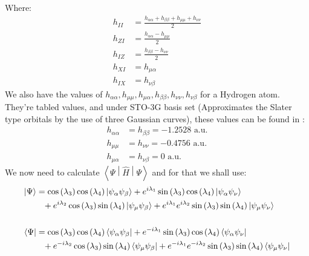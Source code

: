 \documentclass{aux/ttuthes2007}
\newcommand{\bra}[1]{\ensuremath{\left\langle#1\right\vert}}
\newcommand{\ket}[1]{\ensuremath{\left|#1\right\rangle}}
\newcommand{\sandwich}[3]{\left< #1 \middle\vert #2 \middle\vert #3 \right>}
\newcommand{\s}[1]{\sin\left( #1 \right)}
\newcommand{\co}[1]{\cos\left( #1 \right)}
\newcommand{\uo}[1]{
		\IfEqCase{#1}{
			{0}{\mu}
			{1}{\nu}
			{2}{\xi}
		}[\PackageError{uo}{Undefined option to uo: #1}{}]
}
\newcommand{\oo}[1]{
		\IfEqCase{#1}{
			{0}{\alpha}
			{1}{\beta}
			{2}{\gamma}
		}[\PackageError{unocorb}{Undefined option to unuo: #1}{}]
}
\begin{document}
%
Where:
%
\begin{equation*}
	\begin{split}
			h_{II}
		&=	\frac{h_{\alpha\alpha} + h_{\beta\beta} + h_{\mu\mu} + h_{\nu\nu}} 2
%
	\\
%
			h_{ZI}
		&=	\frac{h_{\alpha\alpha} - h_{\mu\mu}} 2
%
	\\
%
			h_{IZ}
		&=	\frac{h_{\beta\beta} - h_{\nu\nu}} 2
%
	\\
%
			h_{XI}
		&= 	h_{\mu\alpha}
%
	\\
%
			h_{IX}
		&=	h_{\nu\beta}
	\end{split}
\end{equation*}
%
We also have the values of
$
h_{\alpha\alpha}, h_{\mu\mu}, h_{\mu\alpha}, h_{\beta\beta}, h_{\nu\nu}, h_{\nu\beta}
$ for a Hydrogen atom. They're tabled values, and under STO-3G basis set (Approximates the Slater type orbitals by the use of three Gaussian curves), these values can be found in :
\begin{equation*}
	\begin{split}
		h_{\alpha\alpha} &= h_{\beta\beta} = -1.2528 \text{ a.u.} \\
		h_{\mu\mu} &= h_{\nu\nu} = -0.4756 \text{ a.u.}\\
		h_{\mu\alpha} &= h_{\nu\beta} = 0 \text{ a.u.}
	\end{split}
\end{equation*}
We now need to calculate $\sandwich{\Psi}{\hat H}{\Psi}$ and for that we shall use:
%
\begin{equation*}
	\begin{split}
	\ket \Psi 
	&= 
	\co {\lambda_3}\co {\lambda_4}\ket {\psi_{\oo 0}\psi_{\oo 1}}
	+ e^{i\lambda_1}\s {\lambda_3}\co {\lambda_4}\ket{\psi_{\oo 0} \psi_{\uo 1}} 
	\\
	&\phantom{=}
	+ e^{i\lambda_2}\co {\lambda_3 }\s {\lambda_4}\ket {\psi_{\uo 0}\psi_{\oo 1}} 
	+ e^{i\lambda_1}e^{i\lambda_2}\s {\lambda_3}\s {\lambda_4}\ket{\psi_{\uo 0} \psi_{\uo 1}} 
	\\
%
%
	\\
	\bra \Psi 
	&= 
	\co {\lambda_3}\co {\lambda_4}\bra {\psi_{\oo 0}\psi_{\oo 1}}
	+ e^{-i\lambda_1}\s {\lambda_3}\co {\lambda_4}\bra{\psi_{\oo 0} \psi_{\uo 1}} 
	\\
	&\phantom{=}
	+ e^{-i\lambda_2}\co {\lambda_3 }\s {\lambda_4}\bra {\psi_{\uo 0}\psi_{\oo 1}} 
	+ e^{-i\lambda_1}e^{-i\lambda_2}\s {\lambda_3}\s {\lambda_4}\bra{\psi_{\uo 0} \psi_{\uo 1}} 
%
%
	\\
	\end{split}
\end{equation*}
\end{document}
